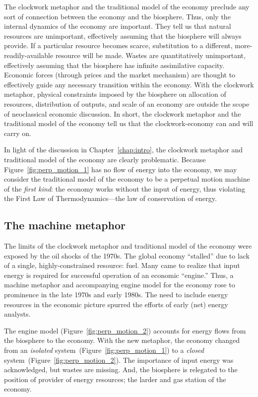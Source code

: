 The clockwork metaphor and the traditional model of the economy
preclude any sort of connection 
between the economy and the biosphere.
Thus, only the internal dynamics of the economy are important. 
They tell us that natural resources are unimportant, 
effectively assuming that the biosphere will always provide.
If a particular resource becomes scarce, 
substitution to a different, more-readily-available resource will be made.
Wastes are quantitatively unimportant, 
effectively assuming that the biosphere has infinite assimilative capacity.
Economic forces (through prices and the market mechanism) 
are thought to effectively guide any necessary transition
within the economy.
With the clockwork metaphor, physical constraints 
imposed by the biosphere 
on allocation of resources, distribution of outputs, and 
scale of an economy 
are outside the scope of neoclassical economic discussion.\cite{Daly1995}
In short, the clockwork metaphor and the traditional model of the economy 
tell us that the clockwork-economy can and will carry on.

In light of the discussion in Chapter~\ref{chap:intro},
the clockwork metaphor and traditional model of the economy
are clearly problematic.
Because Figure~\ref{fig:perp_motion_1} has no flow of energy
into the economy,
we may consider the traditional model of the economy 
to be a perpetual motion machine of the \emph{first kind}:
the economy works without the input of energy, thus violating
the First Law of Thermodynamics---the 
law of conservation of energy.\cite{Rao2004}


\subsection{The machine metaphor}
\label{sec:machine_metaphor}

The limits of the clockwork metaphor and traditional model of the economy were 
exposed by the oil shocks of the 1970s.
The global economy
``stalled'' due to lack of 
a single, highly-constrained resource:
fuel.
Many came to realize that input energy is required
for successful operation of an economic ``engine.''
Thus, a machine metaphor and 
accompanying engine model for the economy 
rose to prominence
in the late 1970s and early 1980s.
The need to include energy resources
in the economic picture
spurred the efforts of early (net) energy 
analysts.\cite{Gilliland1975, Chapman1976}

The engine model (Figure~\ref{fig:perp_motion_2}) 
accounts for energy flows from the biosphere 
to the economy.
With the new metaphor, the economy changed from 
an \emph{isolated} system~(Figure~\ref{fig:perp_motion_1}) to 
a \emph{closed} system~(Figure~\ref{fig:perp_motion_2}). 
The importance of input energy was acknowledged, 
but wastes are missing.
And, the biosphere is relegated to the position
of provider of energy resources;
the larder and gas station of the economy.\cite{Norgaard2010}

